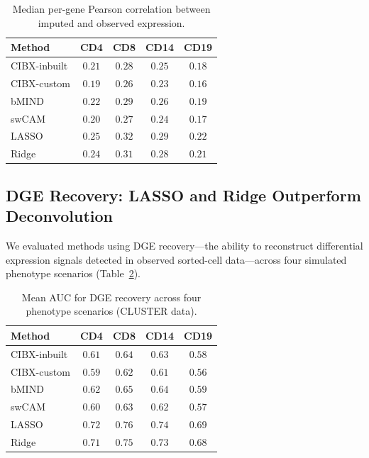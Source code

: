 \documentclass[11pt]{article}
\begin{document}
\begin{table}[H]
\centering
\caption{Median per-gene Pearson correlation between imputed and observed expression.}
\label{tab:corr_gene}
\begin{tabular}{lcccc}
\toprule
\textbf{Method} & \textbf{CD4} & \textbf{CD8} & \textbf{CD14} & \textbf{CD19} \\
\midrule
CIBX-inbuilt & $0.21$ & $0.28$ & $0.25$ & $0.18$ \\
CIBX-custom & $0.19$ & $0.26$ & $0.23$ & $0.16$ \\
bMIND & $0.22$ & $0.29$ & $0.26$ & $0.19$ \\
swCAM & $0.20$ & $0.27$ & $0.24$ & $0.17$ \\
LASSO & $0.25$ & $0.32$ & $0.29$ & $0.22$ \\
Ridge & $0.24$ & $0.31$ & $0.28$ & $0.21$ \\
\bottomrule
\end{tabular}
\end{table}

\subsection{DGE Recovery: LASSO and Ridge Outperform Deconvolution}

We evaluated methods using DGE recovery---the ability to reconstruct differential expression signals detected in observed sorted-cell data---across four simulated phenotype scenarios (Table~\ref{tab:dge}).

\begin{table}[H]
\centering
\caption{Mean AUC for DGE recovery across four phenotype scenarios (CLUSTER data).}
\label{tab:dge}
\begin{tabular}{lcccc}
\toprule
\textbf{Method} & \textbf{CD4} & \textbf{CD8} & \textbf{CD14} & \textbf{CD19} \\
\midrule
CIBX-inbuilt & $0.61$ & $0.64$ & $0.63$ & $0.58$ \\
CIBX-custom & $0.59$ & $0.62$ & $0.61$ & $0.56$ \\
bMIND & $0.62$ & $0.65$ & $0.64$ & $0.59$ \\
swCAM & $0.60$ & $0.63$ & $0.62$ & $0.57$ \\
LASSO & $\mathbf{0.72}$ & $\mathbf{0.76}$ & $\mathbf{0.74}$ & $\mathbf{0.69}$ \\
Ridge & $0.71$ & $0.75$ & $0.73$ & $0.68$ \\
\bottomrule
\end{tabular}
\end{table}
\end{document}
